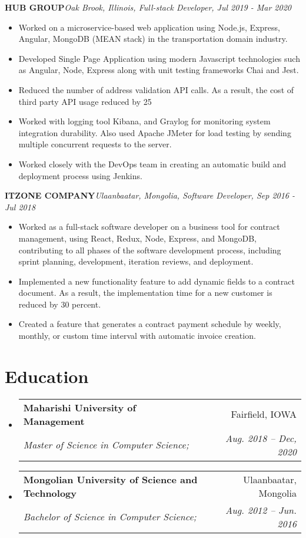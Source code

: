 \documentclass[letterpaper,11pt]{article}
\makeatletter
\newcommand{\resumeSubheading}[4]{
  \vspace{-1pt}\item
    \begin{tabular*}{0.97\textwidth}[t]{l@{\extracolsep{\fill}}r}
      \textbf{#1} & #2 \\
      \textit{\small#3} & \textit{\small #4} \\
    \end{tabular*}\vspace{-5pt}
}
\newcommand{\resumeSubHeadingListStart}{\begin{itemize}[leftmargin=*]}
\newcommand{\resumeSubHeadingListEnd}{\end{itemize}}
\newcommand{\resumeItemListStart}{\begin{itemize}}
\newcommand{\resumeItemListEnd}{\end{itemize}\vspace{-5pt}}
\makeatother
\begin{document}
      \vfill
      \textbf{HUB GROUP}\hfill \textit{Oak Brook, Illinois, Full-stack Developer, Jul 2019 - Mar 2020}
      \resumeItemListStart
        \item{
          Worked on a microservice-based web application using Node.js, Express, Angular, MongoDB (MEAN stack) in the transportation domain industry.
        }
        \item{
          Developed Single Page Application using modern Javascript technologies such as Angular, Node, Express along with unit testing frameworks Chai and Jest. 
        }
        \item{
          Reduced the number of address validation API calls. As a result, the cost of third party API usage reduced by 25%
        }
        \item{
          Worked with logging tool Kibana, and Graylog for monitoring system integration durability. Also used Apache JMeter for load testing by sending multiple concurrent requests to the server.
        }
        \item{
          Worked closely with the DevOps team in creating an automatic build and deployment process using Jenkins. 
        }
      \resumeItemListEnd

      \vfill
      \textbf{ITZONE COMPANY}\hfill \textit{Ulaanbaatar, Mongolia, Software Developer, Sep 2016 - Jul 2018}
      \resumeItemListStart
        \item{
          Worked as a full-stack software developer on a business tool for contract management, using React, Redux, Node, Express, and MongoDB, contributing to all phases of the software development process, including sprint planning, development, iteration reviews, and deployment.
        }
        \item{
          Implemented a new functionality feature to add dynamic fields to a contract document. As a result, the implementation time for a new customer is reduced by 30 percent.
        }
        \item{
          Created a feature that generates a contract payment schedule by weekly, monthly, or custom time interval with automatic invoice creation.
        }
      \resumeItemListEnd
  
\section{Education}
  \resumeSubHeadingListStart
    \resumeSubheading
      {Maharishi University of Management}{Fairfield, IOWA}
      {Master of Science in Computer Science;}{Aug. 2018 -- Dec, 2020}
    \resumeSubheading
      {Mongolian University of Science and Technology}{Ulaanbaatar, Mongolia}
      {Bachelor of Science in Computer Science;}{Aug. 2012 -- Jun. 2016}
  \resumeSubHeadingListEnd

\end{document}

